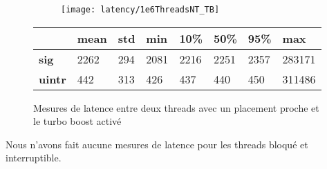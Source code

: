 \begin{figure}[H]
  \begin{subfigure}{\textwidth}
    \texttt{[image: latency/1e6ThreadsNT\_TB]}
    \caption{}
    \label{subfig:latency1e6ThreadsNT-TB}
  \end{subfigure}
  \begin{subtable}{\textwidth}
    \centering
    \begin{tabular}{| l | l | l | l | l | l | l | l |}
      \hline
      &\bf mean &\bf std &\bf min  &\bf 10\% &\bf 50\% &\bf 95\% &\bf max\\
      \hline
      \bf sig   & 2262 & 294 & 2081 & 2216 & 2251 & 2357 & 283171\\
      \hline
      \bf uintr & 442  & 313 & 426  & 437  & 440  & 450  & 311486\\
      \hline
    \end{tabular}
    \caption{}
    \label{tab:latency1e6ThreadsNT-TB}
  \end{subtable}
  \caption{Mesures de latence entre deux threads avec un placement proche et le turbo boost activé}
  \label{fig:latency1e6ThreadsNT-TB}
\end{figure}

Nous n'avons fait aucune mesures de latence pour les threads bloqué et interruptible.
